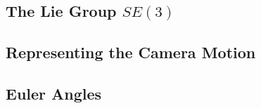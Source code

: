 \subsection{The Lie Group $SE(3)$}
\label{sub:the_lie_group_se_3_}


\subsection{Representing the Camera Motion}
\label{sub:representing_the_camera_motion}


\subsection{Euler Angles}
\label{sub:euler_angles}


